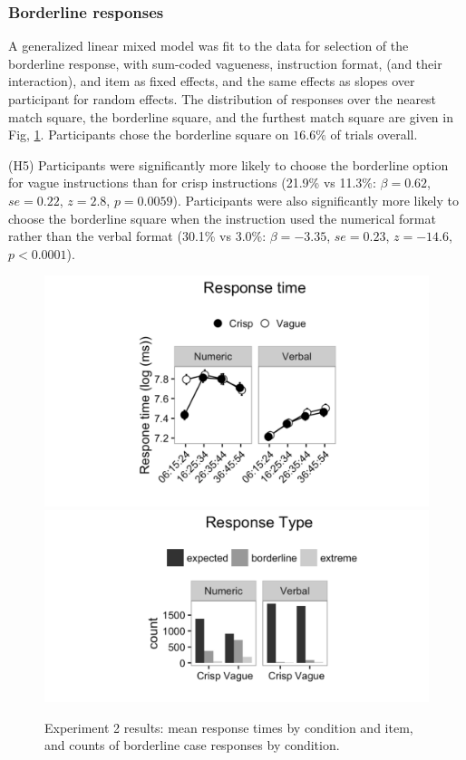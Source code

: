 \documentclass[%
man,		%
floatsintext,%
apacite%
]{apa6}
\begin{document}
\subsubsection{Borderline responses} %
A generalized linear mixed model \cite{jaeger2008categorical} was fit to the data for selection of the borderline response, with sum-coded vagueness, instruction format, (and their interaction), and item as fixed effects, and the same effects as slopes over participant for random effects. The distribution of responses over the nearest match square, the borderline square, and the furthest match square are given in Fig, \ref{resultse2}. Participants chose the borderline square on $16.6\%$ of trials overall.  
\begin{APAenumerate}
	\item [(H5)] Participants were significantly more likely to choose the borderline option for vague instructions than for crisp instructions (21.9\% vs 11.3\%: $\beta=0.62$, $se=0.22$, $z=2.8$, $p=0.0059$). Participants were also significantly more likely to choose the borderline square when the instruction used the numerical format rather than the verbal format (30.1\% vs 3.0\%: $\beta=-3.35$, $se=0.23$, $z=-14.6$, $p<0.0001$). 
\end{APAenumerate}

\begin{figure}[htbp]
\centering
\includegraphics[trim = 0mm 0mm 0mm 0mm, clip, width=.49\textwidth]{images/e2rt.pdf}
\includegraphics[trim = 0mm -23mm 0mm 0mm, clip, width=.49\textwidth]{images/e2bl.pdf}
\caption{Experiment 2 results: mean response times by condition and item, and counts of borderline case responses by condition.}
\label{resultse2}
\end{figure}
\end{document}

